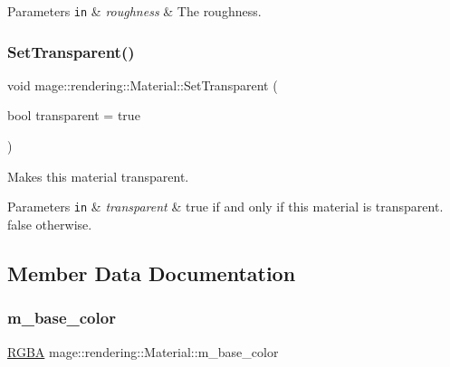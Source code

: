 \begin{DoxyParams}[1]{Parameters}
\mbox{\tt in}  & {\em roughness} & The roughness. \\
\hline
\end{DoxyParams}
\mbox{\label{classmage_1_1rendering_1_1_material_a8da0e0ed4df1e9ce0c7381d88b6d6c48}} 
\subsubsection{\texorpdfstring{Set\+Transparent()}{SetTransparent()}}
{\footnotesize\ttfamily void mage\+::rendering\+::\+Material\+::\+Set\+Transparent (\begin{DoxyParamCaption}\item[{bool}]{transparent = {\ttfamily true} }\end{DoxyParamCaption})\hspace{0.3cm}{\ttfamily [noexcept]}}

Makes this material transparent.


\begin{DoxyParams}[1]{Parameters}
\mbox{\tt in}  & {\em transparent} & {\ttfamily true} if and only if this material is transparent. {\ttfamily false} otherwise. \\
\hline
\end{DoxyParams}


\subsection{Member Data Documentation}
\mbox{\label{classmage_1_1rendering_1_1_material_aab907c723f66f06c8512014e7e217778}} 
\subsubsection{\texorpdfstring{m\+\_\+base\+\_\+color}{m\_base\_color}}
{\footnotesize\ttfamily \mbox{\hyperlink{structmage_1_1_r_g_b_a}{R\+G\+BA}} mage\+::rendering\+::\+Material\+::m\+\_\+base\+\_\+color\hspace{0.3cm}{\ttfamily [private]}}

